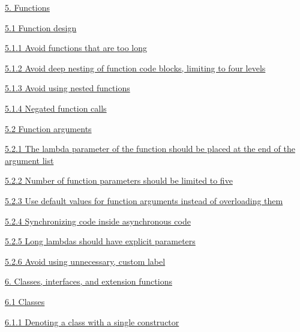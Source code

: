 \hspace{0.0cm}\hyperref[sec:5.]{5. Functions}

\hspace{0.5cm}\hyperref[sec:5.1]{ 5.1 Function design}

\hspace{1.0cm}\hyperref[sec:5.1.1]{ 5.1.1 Avoid functions that are too long }

\hspace{1.0cm}\hyperref[sec:5.1.2]{ 5.1.2 Avoid deep nesting of function code blocks, limiting to four levels}

\hspace{1.0cm}\hyperref[sec:5.1.3]{ 5.1.3 Avoid using nested functions}

\hspace{1.0cm}\hyperref[sec:5.1.4]{ 5.1.4 Negated function calls}

\hspace{0.5cm}\hyperref[sec:5.2]{ 5.2 Function arguments}

\hspace{1.0cm}\hyperref[sec:5.2.1]{ 5.2.1 The lambda parameter of the function should be placed at the end of the argument list}

\hspace{1.0cm}\hyperref[sec:5.2.2]{ 5.2.2 Number of function parameters should be limited to five}

\hspace{1.0cm}\hyperref[sec:5.2.3]{ 5.2.3 Use default values for function arguments instead of overloading them}

\hspace{1.0cm}\hyperref[sec:5.2.4]{ 5.2.4 Synchronizing code inside asynchronous code}

\hspace{1.0cm}\hyperref[sec:5.2.5]{ 5.2.5 Long lambdas should have explicit parameters}

\hspace{1.0cm}\hyperref[sec:5.2.6]{ 5.2.6 Avoid using unnecessary, custom label}

\hspace{0.0cm}\hyperref[sec:]{}

\hspace{0.0cm}\hyperref[sec:6.]{6. Classes, interfaces, and extension functions}

\hspace{0.5cm}\hyperref[sec:6.1]{ 6.1 Classes}

\hspace{1.0cm}\hyperref[sec:6.1.1]{ 6.1.1 Denoting a class with a single constructor}

